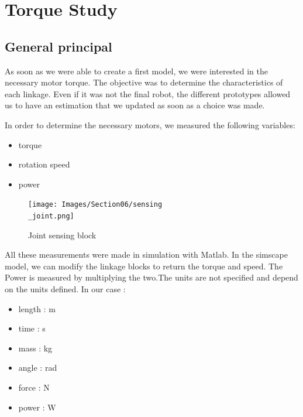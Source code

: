 \section{Torque Study}\insertloftspace
\setcounter{figure}{0}\setcounter{table}{0}

\subsection{General principal}

As soon as we were able to create a first model, we were interested in the necessary motor torque. The objective was to determine the characteristics of each linkage. Even if it was not the final robot, the different prototypes allowed us to have an estimation that we updated as soon as a choice was made. 

\bigbreak
In order to determine the necessary motors, we measured the following variables:
\begin{multicols}{3}
    \begin{itemize}[noitemsep]
        \item torque
        \item rotation speed
        \item power
    \end{itemize}
\end{multicols}

\bigbreak
\begin{figure}[ht]
    \centering
    \texttt{[image: Images/Section06/sensing\\\_joint.png]}
    \caption{Joint sensing block}
    \label{fig:SensingBlock}
\end{figure}
\FloatBarrier

\bigbreak
All these measurements were made in simulation with Matlab. In the simscape model, we can modify the linkage blocks to return the torque and speed. The Power is measured by multiplying the two.The units are not specified and depend on the units defined. In our case : 
\begin{multicols}{2}
    \begin{itemize}[noitemsep]
        \item length : m
        \item time : s
        \item mass : kg
        \item angle : rad
        \item force : N
        \item power : W
    \end{itemize}
\end{multicols}

